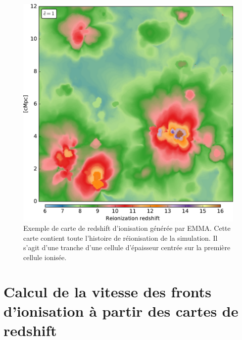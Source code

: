 \begin{figure}
        \includegraphics[width=.95\linewidth]{img/04_mapreio/map_z_c1.pdf} 
        \caption[Carte de redshift d'ionisation]{Exemple de carte de redshift d'ionisation générée par EMMA.
        Cette carte contient toute l'histoire de réionisation de la simulation.
        Il s'agit d'une tranche d'une cellule d'épaisseur centrée sur la première cellule ionisée.
 		\label{fig:zmap}}
\end{figure}

\clearpage
\section{Calcul de la vitesse des fronts d’ionisation à partir des cartes de redshift}
\label{sec:vreio}

